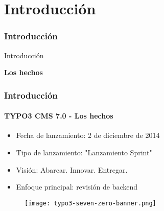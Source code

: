 %

\section{Introducción}
\begin{frame}[fragile]
	\frametitle{Introducción}

	\begin{center}\huge{Introducción}\end{center}
	\begin{center}\huge{\color{typo3darkgrey}\textbf{Los hechos}}\end{center}

\end{frame}


\begin{frame}[fragile]
	\frametitle{Introducción}
	\framesubtitle{TYPO3 CMS 7.0 - Los hechos}

	\begin{itemize}
		\item Fecha de lanzamiento: 2 de diciembre de 2014
		\item Tipo de lanzamiento: "Lanzamiento Sprint"
		\item Visión: Abarcar. Innovar. Entregar.
		\item Enfoque principal: revisión de backend
	\end{itemize}

	\begin{figure}
		\texttt{[image: typo3-seven-zero-banner.png]}
	\end{figure}

\end{frame}

